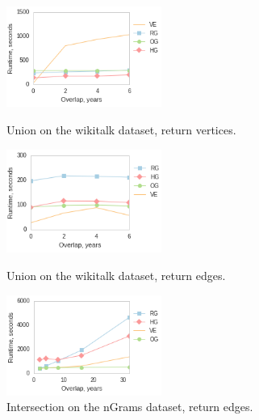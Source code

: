 \begin{figure}[h]
\begin{minipage}{2.2in}
\centering
\includegraphics[width=2in]{figs/union_wikitalk_vertices_build12.png}
\caption{Union on the wikitalk dataset, return vertices.}
\label{fig:union1}
\end{minipage}
\begin{minipage}{2.2in}
\centering
\includegraphics[width=2in]{figs/union_wikitalk_edges_build12.png}
\caption{Union on the wikitalk dataset, return edges.}
\label{fig:union2}
\end{minipage}
\begin{minipage}{2.2in}
\centering
\includegraphics[width=2in]{figs/intersect_ngrams_edges_build12.png}
\caption{Intersection on the nGrams dataset, return edges.}
\label{fig:intersect}
\end{minipage}
\end{figure}

